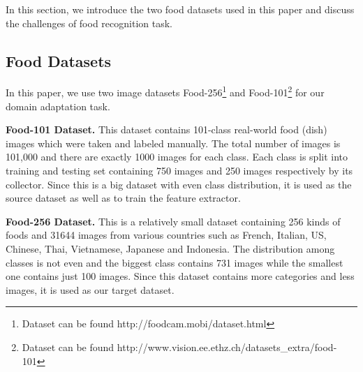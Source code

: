 In this section, we introduce the two food datasets used in this paper and discuss the challenges of food recognition task.
\subsection{Food Datasets}
 In this paper, we use two image datasets Food-256\footnote{Dataset can be found http://foodcam.mobi/dataset.html} \cite{kawano14c} and Food-101\footnote{Dataset can be found http://www.vision.ee.ethz.ch/datasets\_extra/food-101} \cite{bossard14} for our domain adaptation task.

\textbf{Food-101 Dataset.}
This dataset contains 101-class real-world food (dish) images which were taken and labeled manually. The total number of images is 101,000 and there are exactly 1000 images for each class. Each class is split into training and testing set containing 750 images and 250 images respectively by its collector. Since this is a big dataset with even class distribution, it is used as the source dataset as well as to train the feature extractor.

\textbf{Food-256 Dataset.}
This is a relatively small dataset containing 256 kinds of foods and 31644 images from various countries such as French, Italian, US, Chinese, Thai, Vietnamese, Japanese and Indonesia. The distribution among classes is not even and the biggest class contains 731 images while the smallest one contains just 100 images. Since this dataset contains more categories and less images, it is used as our target dataset.


